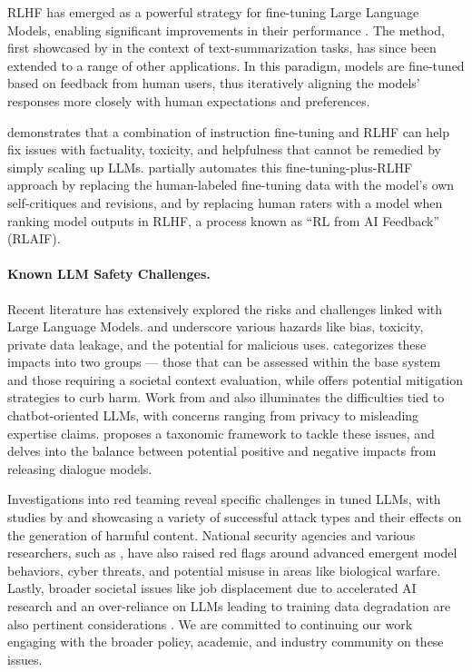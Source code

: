 RLHF has emerged as a powerful strategy for fine-tuning Large Language Models, enabling significant improvements in their performance \citep{christiano-etal-2017-deep}. The method, first showcased by \citet{stienon2020learning} in the context of text-summarization tasks, has since been extended to a range of other applications. In this paradigm, models are fine-tuned based on feedback from human users, thus iteratively aligning the models' responses more closely with human expectations and preferences.

\citet{ouyang2022training} demonstrates that a combination of instruction fine-tuning and RLHF can help fix issues with factuality, toxicity, and helpfulness that cannot be remedied by simply scaling up LLMs. \citet{bai2022constitutional} partially automates this fine-tuning-plus-RLHF approach by replacing the human-labeled fine-tuning data with the model's own self-critiques and revisions, and by replacing human raters with a model when ranking model outputs in RLHF, a process known as ``RL from AI Feedback'' (RLAIF).

\paragraph{Known LLM Safety Challenges.}
\label{sec:safety_background}
Recent literature has extensively explored the risks and challenges linked with Large Language Models. \cite{bender2021dangers} and \citet{weidinger2021ethical} underscore various hazards like bias, toxicity, private data leakage, and the potential for malicious uses. \citet{solaiman2023evaluating} categorizes these impacts into two groups --- those that can be assessed within the base system and those requiring a societal context evaluation, while \citet{kumar2022language} offers potential mitigation strategies to curb harm. Work from \citet{roller2020open} and \citet{dinan2021anticipating} also illuminates the difficulties tied to chatbot-oriented LLMs, with concerns ranging from privacy to misleading expertise claims. \citet{deng2023recent}  proposes a taxonomic framework to tackle these issues, and \citet{bergman2022guiding} delves into the balance between potential positive and negative impacts from releasing dialogue models.

Investigations into red teaming reveal specific challenges in tuned LLMs, with studies by \citet{ganguli2022red} and \citet{zhuo2023exploring} showcasing a variety of successful attack types and their effects on the generation of harmful content. National security agencies and various researchers, such as \citep{mialon2023augmented}, have also raised red flags around advanced emergent model behaviors, cyber threats, and potential misuse in areas like biological warfare. Lastly, broader societal issues like job displacement due to accelerated AI research and an over-reliance on LLMs leading to training data degradation are also pertinent considerations \citep{acemoglu2018artificial,autor2018automation,webb2019impact, shumailov2023curse}. We are committed to continuing our work engaging with the broader policy, academic, and industry community on these issues. 

